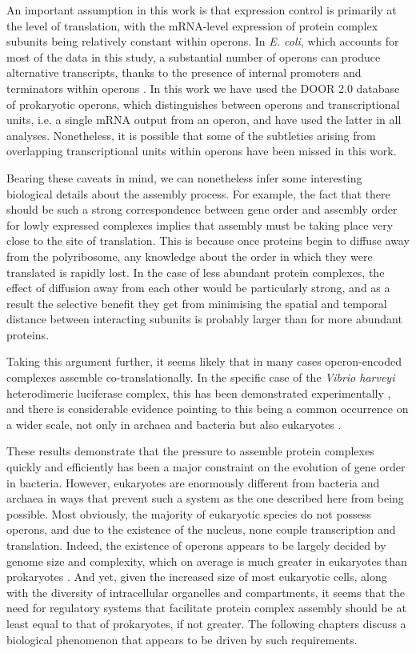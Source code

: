 \documentclass[a4paper,11pt,twoside,openright]{scrbook}
\begin{document}
An important assumption in this work is that expression control is primarily at
the level of translation, with the mRNA-level expression of protein complex
subunits being relatively constant within operons. In \textit{E. coli}, which
accounts for most of the data in this study, a substantial number of operons can
produce alternative transcripts, thanks to the presence of internal promoters
and terminators within operons \cite{Conway2014}. In this work we have used the
DOOR 2.0 database of prokaryotic operons, which distinguishes between operons
and transcriptional units, i.e. a single mRNA output from an operon, and have
used the latter in all analyses. Nonetheless, it is possible that some of the
subtleties arising from overlapping transcriptional units within operons have
been missed in this work.

Bearing these caveats in mind, we can nonetheless infer some interesting
biological details about the assembly process. For example, the fact that there
should be such a strong correspondence between gene order and assembly order for
lowly expressed complexes implies that assembly must be taking place very close
to the site of translation. This is because once proteins begin to diffuse away
from the polyribosome, any knowledge about the order in which they were
translated is rapidly lost. In the case of less abundant protein complexes, the
effect of diffusion away from each other would be particularly strong, and as a
result the selective benefit they get from minimising the spatial and temporal
distance between interacting subunits is probably larger than for more abundant
proteins.

Taking this argument further, it seems likely that in many cases operon-encoded
complexes assemble co-translationally. In the specific case of the
\textit{Vibrio harveyi} heterodimeric luciferase complex, this has been
demonstrated experimentally \cite{Shieh2015a}, and there is considerable
evidence pointing to this being a common occurrence on a wider scale, not only
in archaea and bacteria but also eukaryotes
\cite{Duncan2011,Wells2015,Natan2017}.

These results demonstrate that the pressure to assemble protein complexes
quickly and efficiently has been a major constraint on the evolution of gene
order in bacteria. However, eukaryotes are enormously different from bacteria
and archaea in ways that prevent such a system as the one described here from
being possible. Most obviously, the majority of eukaryotic species do not
possess operons, and due to the existence of the nucleus, none couple
transcription and translation. Indeed, the existence of operons appears to be
largely decided by genome size and complexity, which on average is much greater
in eukaryotes than prokaryotes \cite{Nunez2013}. And yet, given the increased
size of most eukaryotic cells, along with the diversity of intracellular
organelles and compartments, it seems that the need for regulatory systems that
facilitate protein complex assembly should be at least equal to that of
prokaryotes, if not greater. The following chapters discuss a biological
phenomenon that appears to be driven by such requirements.

\end{document}
